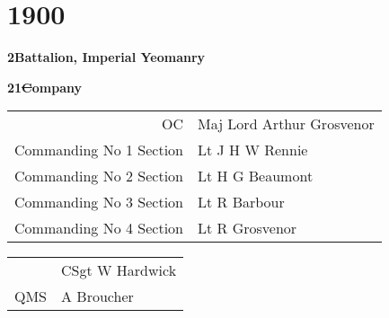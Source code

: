 \chapter*{1900}

\vspace*{10mm}

\begin{center}
  \Large
  \textbf{2\nd Battalion, Imperial Yeomanry}
\end{center}

\vspace*{10mm}

\begin{center}
  \Large
  \textbf{21\st Company}
\end{center}

\vspace*{3mm}

\begin{center}
  \begin{tabular}{rl}
    OC & Maj Lord Arthur Grosvenor \\
    Commanding No 1 Section & Lt J H W Rennie \\
    Commanding No 2 Section & Lt H G Beaumont \\
    Commanding No 3 Section & Lt R Barbour \\
    Commanding No 4 Section & Lt R Grosvenor \\
  \end{tabular}
\end{center}

\vspace*{3mm}

\begin{center}
  \begin{tabular}{rl}
    & CSgt W Hardwick \\
    QMS & A Broucher \\
  \end{tabular}
\end{center}

\vspace*{3mm}

